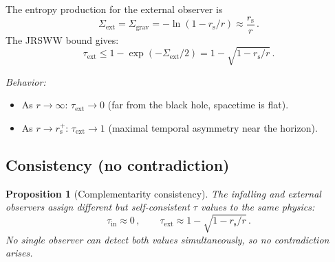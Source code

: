 \documentclass[aps,prd,preprint,superscriptaddress,longbibliography]{revtex4-2}
\newtheorem{proposition}[theorem]{Proposition}
\newcommand{\tauasym}{\tau}
\newcommand{\rs}{r_{\mathrm{s}}}
\newcommand{\Sgrav}{\Sigma_{\mathrm{grav}}}
\begin{document}
The entropy production for the external observer is~\cite{Paper2}
\begin{equation}
  \Sigma_{\mathrm{ext}} = \Sgrav = -\ln(1-\rs/r)
  \approx \frac{\rs}{r}\,.
  \label{eq:Sigma_ext}
\end{equation}
The JRSWW bound gives:
\begin{equation}
  \tauasym_{\mathrm{ext}} \leq 1 - \exp(-\Sigma_{\mathrm{ext}}/2)
  = 1 - \sqrt{1 - \rs/r}\,.
  \label{eq:tau_ext}
\end{equation}

\emph{Behavior:}
\begin{itemize}
\item As $r \to \infty$: $\tauasym_{\mathrm{ext}} \to 0$
  (far from the black hole, spacetime is flat).
\item As $r \to \rs^+$: $\tauasym_{\mathrm{ext}} \to 1$
  (maximal temporal asymmetry near the horizon).
\end{itemize}

\subsection{Consistency (no contradiction)}

\begin{proposition}[Complementarity consistency]
The infalling and external observers assign different but
self-consistent $\tauasym$ values to the same physics:
\begin{equation}
  \tauasym_{\mathrm{in}} \approx 0\,,\qquad
  \tauasym_{\mathrm{ext}} \approx 1 - \sqrt{1-\rs/r}\,.
  \label{eq:complementarity}
\end{equation}
No single observer can detect both values simultaneously, so no
contradiction arises.
\end{proposition}
\end{document}
